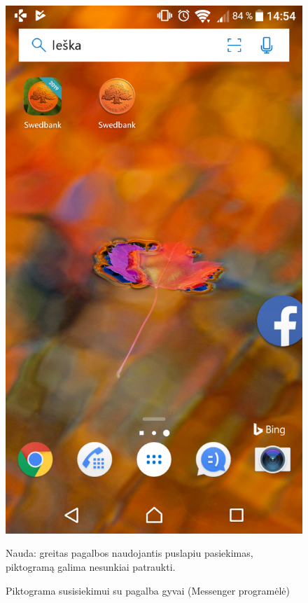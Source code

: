 \documentclass{VUMIFPSkursinis}
\begin{document}
\begin{figure}[!htb]
	\begin{center}
	\includegraphics[scale=0.2]{pagalbaGyvai.png}
	\end{center}
  \caption{Piktograma susisiekimui su pagalba gyvai (Messenger programėlė)}
	\label{fig:pagalbaGyvai}
	Nauda: greitas pagalbos naudojantis puslapiu pasiekimas, piktogramą galima nesunkiai patraukti.
\end{figure}
\end{document}
